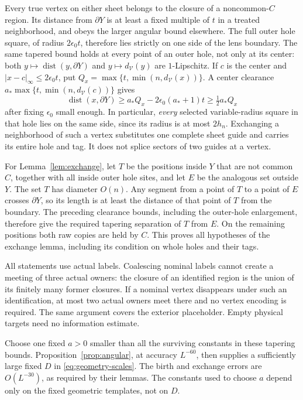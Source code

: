 \documentclass[11pt]{article}
\numberwithin{equation}{section}
\theoremstyle{definition}
\theoremstyle{remark}
\DeclareMathOperator{\dist}{dist}
\begin{document}
Every true vertex on either sheet belongs to the closure of a
noncommon-$C$ region.  Its distance from $\partial Y$ is at least a
fixed multiple of $t$ in a treated neighborhood, and obeys the larger
angular bound elsewhere.  The full outer hole square, of radius
$2\epsilon_0t$, therefore lies strictly on one side of the lens
boundary.  The same tapered bound holds at every point of an outer hole, not only
at its center: both $y\mapsto\dist(y,\partial Y)$ and
$y\mapsto d_{\mathcal V}(y)$ are $1$-Lipschitz. If $c$ is the center
and $|x-c|_\infty\le2\epsilon_0t$, put
$Q_x=\max\{t,\min(n,d_{\mathcal V}(x))\}$. A center clearance
$a_*\max\{t,\min(n,d_{\mathcal V}(c))\}$ gives
\[
 \dist(x,\partial Y)\ge a_*Q_x-2\epsilon_0(a_*+1)t
                   \ge \tfrac12a_*Q_x
\]
after fixing $\epsilon_0$ small enough. In particular, \emph{every}
selected variable-radius square in that hole lies on the same side,
since its radius is at most $2h_n$.  Exchanging a neighborhood of such a vertex substitutes one
complete sheet guide and carries its entire hole and tag.  It does
not splice sectors of two guides at a vertex.

For Lemma~\ref{lem:exchange}, let $T$ be the positions inside $Y$
that are not common $C$, together with all inside outer hole sites,
and let $E$ be the analogous set outside $Y$.  The set $T$ has
diameter $O(n)$.  Any segment from a point of $T$ to a point of $E$
crosses $\partial Y$, so its length is at least the distance of that
point of $T$ from the boundary.  The preceding clearance bounds,
including the outer-hole enlargement, therefore give the required
tapering separation of $T$ from $E$.  On the remaining positions both
raw copies are held by $C$.  This proves all hypotheses of the exchange
lemma, including its condition on whole holes and their tags.

All statements use actual labels.  Coalescing nominal labels cannot
create a meeting of three actual owners: the closure of an identified
region is the union of its finitely many former closures.  If a nominal
vertex disappears under such an identification, at most two actual
owners meet there and no vertex encoding is required.  The same
argument covers the exterior placeholder.  Empty physical targets
need no information estimate.

Choose one fixed $a>0$ smaller than all the surviving constants in
these tapering bounds.  Proposition~\ref{prop:angular}, at accuracy
$L^{-60}$, then supplies a sufficiently large fixed $D$ in
\eqref{eq:geometry-scales}.  The birth and exchange errors are
$O(L^{-30})$, as required by their lemmas.  The constants used to
choose $a$ depend only on the fixed geometric templates, not on $D$.
\end{document}
